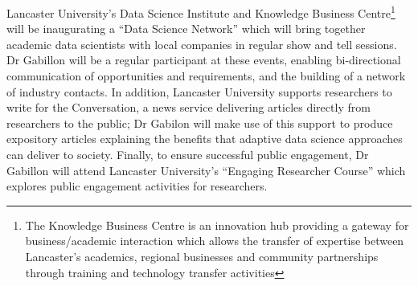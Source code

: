 \documentclass[a4paper,11pt]{article}
\newcommand{\TODO}[1]{{\textcolor{red}{[\textbf{TODO:} #1]}}}
\begin{document}
%

Lancaster University's Data Science Institute and Knowledge Business Centre\footnote{The Knowledge Business Centre is an innovation hub providing a gateway for business/academic interaction which allows the transfer of expertise between Lancaster's academics, regional businesses and community partnerships through training and technology transfer activities} will be inaugurating a ``Data Science Network'' which will bring together academic data scientists with local companies in regular show and tell sessions.  Dr Gabillon will be a regular participant at these events, enabling bi-directional communication of opportunities and requirements, and the building of a network of industry contacts.
In addition, Lancaster University supports researchers to write for the Conversation, a news  service delivering articles directly from researchers to the public; Dr Gabilon will make use of this support to produce expository articles explaining the benefits that adaptive data science approaches can deliver to society.
Finally, to ensure successful public engagement, Dr Gabillon will attend Lancaster University's ``Engaging Researcher Course'' which explores public engagement activities for researchers.
\end{document}
